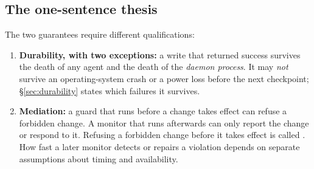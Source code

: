 \documentclass[11pt,a4paper]{article}
\theoremstyle{definition}
\theoremstyle{remark}
\begin{document}
\subsection{The one-sentence thesis}
The two guarantees require different qualifications:
\begin{enumerate}[leftmargin=1.4em]
  \item \textbf{Durability, with two exceptions:} a write that returned success
  survives the death of any agent and the death of the \emph{daemon process}.
  It may \emph{not} survive an operating-system crash or a power loss before the
  next checkpoint; \S\ref{sec:durability} states which failures it survives.
  \item \textbf{Mediation:} a guard that runs before a change takes effect can
  refuse a forbidden change. A monitor that runs afterwards can only report the
  change or respond to it. Refusing a forbidden change before it takes effect
  is called . How fast a later monitor detects or repairs
  a violation depends on separate assumptions about timing and availability.
\end{enumerate}

\ifdefined\pdswisslandmarkplate
\begin{figure}[p]
  \centering
\end{figure}
\pdmarginpagebreak
\fi
\end{document}
